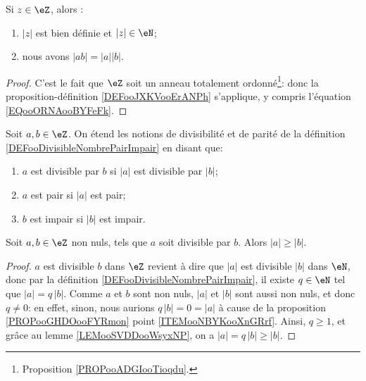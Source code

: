 \begin{proposition}	\label{PROPooRelatifsValAbs}
	Si \( z \in \eZ \), alors :
	\begin{enumerate}
		\item
		      \( |z| \) est bien définie et \( |z| \in \eN \);
		\item
		      nous avons \( | ab |=| a || b | \).
	\end{enumerate}
\end{proposition}

\begin{proof}
	C'est le fait que \( \eZ\) soit un anneau totalement ordonné\footnote{Proposition \ref{PROPooADGIooTioqdu}.}: donc la proposition-définition \ref{DEFooJXKVooErANPh} s'applique, y compris l'équation \eqref{EQooORNAooBYFeFk}.
\end{proof}


\begin{definition}	\label{DEFooRelatifsDiviseurParite}
	Soit \( a, b \in \eZ \). On étend les notions de divisibilité et de parité de la définition \ref{DEFooDivisibleNombrePairImpair} en disant que:
	\begin{enumerate}
		\item
		      \( a \) est divisible par \( b \) si \( |a| \) est divisible par \( |b| \);
		\item
		      \( a \) est pair si \( |a| \) est pair;
		\item
		      \( b \) est impair si \( |b| \) est impair.
	\end{enumerate}
\end{definition}

\begin{proposition} \label{PROPooYJBMooZrzkNX}
	Soit \( a,b\in \eZ\) non nuls, tels que \( a\) soit divisible par \( b\). Alors \( | a |\geq | b |\).
\end{proposition}

\begin{proof}
	\( a\) est divisible \( b\) dans \( \eZ \) revient à dire que \( |a| \) est divisible \( |b| \) dans \( \eN \), donc par la définition \ref{DEFooDivisibleNombrePairImpair}, il existe \( q \in \eN \) tel que \( |a| = q\, |b| \). Comme \( a \) et \( b \) sont non nuls, \( |a| \) et \( |b| \) sont aussi non nuls, et donc \( q \neq 0 \): en effet, sinon, nous aurions \( q\, |b| = 0 = |a| \) à cause de la proposition \ref{PROPooGHDOooFYRmon} point \ref{ITEMooNBYKooXnGRrf}. Ainsi, \( q \geq 1 \), et grâce au lemme \ref{LEMooSVDDooWsyxNP}, on a \(|a| = q\, |b| \geq |b| \).
\end{proof}

